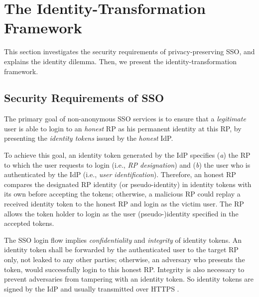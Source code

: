 \section{The Identity-Transformation Framework}
\label{sec:challenge}

This section investigates the security requirements of privacy-preserving SSO,
    and explains the identity dilemma.
Then,
    we present the identity-transformation framework.


\subsection{Security Requirements of SSO}
\label{subsec:basicrequirements}

The primary goal of non-anonymous SSO services is %
 to ensure that a \emph{legitimate} user is able to login to an \emph{honest} RP as his permanent identity at this RP, %
    by presenting the \emph{identity tokens} issued by the \emph{honest} IdP.

To achieve this goal,
 an identity token generated by the IdP  specifies (\emph{a}) the RP to which the user requests to login (i.e., \emph{RP designation})
    and  (\emph{b}) the user who is authenticated by the IdP (i.e., \emph{user identification}).
Therefore,
    an honest RP compares the designated RP identity (or pseudo-identity) in identity tokens with its own before accepting the tokens;
     otherwise,
        a malicious RP could replay a received identity token to the honest RP and login as the victim user.
The RP allows the token holder to login as the user (pseudo-)identity specified in the accepted tokens.

The SSO login flow implies \emph{confidentiality} and \emph{integrity} of identity tokens.
An identity token shall be forwarded by the authenticated user to the target RP only,
    not leaked to any other parties;
        otherwise, an adversary who presents the token, would successfully login to this honest RP.
Integrity is also necessary
    to prevent adversaries from tampering with an identity token.
So identity tokens are signed by the IdP and usually transmitted over HTTPS \cite{OpenIDConnect,rfc6749,SAML}.

